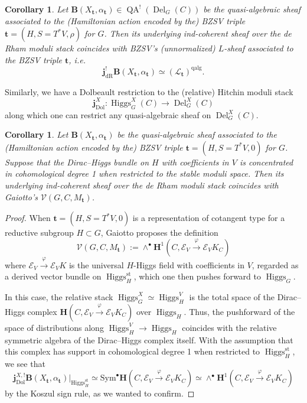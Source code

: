 \documentclass[11pt, a4paper]{amsart}
\numberwithin{equation}{section}
\newtheorem{corollary}[theorem]{Corollary}
\theoremstyle{definition}
\theoremstyle{remark}
\DeclareMathOperator{\Higgs}{Higgs}
\DeclareMathOperator{\Dol}{Dol}
\DeclareMathOperator{\dR}{dR}
\DeclareMathOperator{\Del}{Del}
\DeclareMathOperator{\QA}{QA}
\DeclareMathOperator{\qalg}{\mathrm{qalg}}
\newcommand{\Ee}{\mathcal{E}}
\newcommand{\Ll}{\mathcal{L}}
\newcommand{\bB}{\mathbf{B}}
\renewcommand{\to}{\longrightarrow}
\begin{document}
\begin{corollary} \label{co relation with BZSV}
    Let $\bB(X_{\mathbf{t}},\alpha_{\mathbf{t}}) \in \QA^!(\Del_G(C))$ be the quasi-algebraic sheaf associated to the (Hamiltonian action encoded by the) BZSV triple $\mathbf{t} = (H, S = T^*V, \rho)$ for $G$. Then its underlying ind-coherent sheaf over the de Rham moduli stack coincides with BZSV's (unnormalized) $L$-sheaf associated to the BZSV triple $\mathbf{t}$, {\it i.e. }
    $$\mathbf{j}_{\dR}^!\bB(X_\mathbf{t},\alpha_\mathbf{t}) \simeq \left ( \Ll_{\mathbf{t}}\right )^{\qalg}.$$
\end{corollary}
Similarly, we have a Dolbeault restriction to the (relative) Hitchin moduli stack
$$\mathbf{j}_{\Dol}^X: \Higgs_G^X(C) \to \Del_G^X(C)$$
along which one can restrict any quasi-algebraic sheaf on $\Del_G^X(C)$.
\begin{corollary}\label{co relation with Gaiotto}
    Let $\bB(X_\mathbf{t}, \alpha_{\mathbf{t}})$ be the quasi-algebraic sheaf associated to the (Hamiltonian action encoded by the) BZSV triple $\mathbf{t} = (H, S = T^*V,0)$ for $G$. Suppose that the Dirac--Higgs bundle on $H$ with coefficients in $V$ is concentrated in cohomological degree 1 when restricted to the stable moduli space. Then its underlying ind-coherent sheaf over the de Rham moduli stack coincides with Gaiotto's $\mathcal{V}(G,C,M_{\mathbf{t}})$.
\end{corollary}
\begin{proof}
    When $\mathbf{t} = (H, S = T^*V, 0)$ is a representation of cotangent type for a reductive subgroup $H \subset G$, Gaiotto proposes the definition 
    $$\mathcal{V}(G,C,M_{\mathbf{t}}) := \wedge^\bullet \mathbf{H}^1(C, \Ee_V \overset{\varphi}{\to} \Ee_VK_C)$$
    where $\Ee_V \overset{\varphi}{\to} \Ee_VK$ is the universal $H$-Higgs field with coefficients in $V$, regarded as a derived vector bundle on $\Higgs_H^{\mathrm{st}}$, which one then pushes forward to $\Higgs_G$. 

    In this case, the relative stack $\Higgs_G^X \simeq \Higgs_H^V$ is the total space of the Dirac--Higgs complex $\mathbf{H}(C, \Ee_V \overset{\varphi}{\to} \Ee_V K_C)$ over $\Higgs_H$. Thus, the pushforward of the space of distributions along $\Higgs_H^V \to \Higgs_H$ coincides with the relative symmetric algebra of the Dirac--Higgs complex itself. With the assumption that this complex has support in cohomological degree 1 when restricted to $\Higgs_H^{\mathrm{st}}$, we see that 
    $$\mathbf{j}_{\Dol}^{X, !}\bB(X_{\mathbf{t}}, \alpha_{\mathbf{t}})|_{\Higgs_H^{\mathrm{st}}} \simeq \mathrm{Sym}^\bullet \mathbf{H}(C, \Ee_V \overset{\varphi}{\to} \Ee_V K_C) \simeq \wedge^\bullet \mathbf{H}^1(C, \Ee_V \overset{\varphi}{\to} \Ee_VK_C)$$
    by the Koszul sign rule, as we wanted to confirm.
\end{proof}
\end{document}
